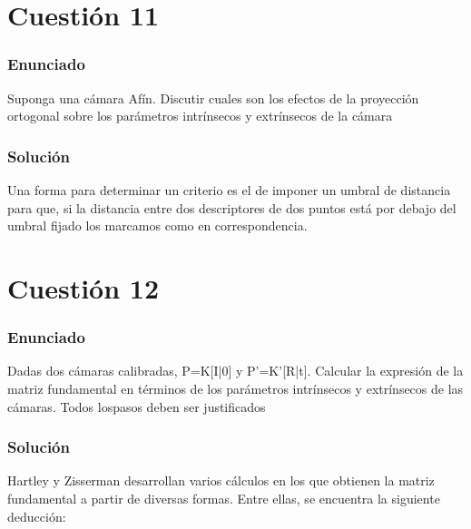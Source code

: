 
\section{Cuestión 11}

\subsubsection{Enunciado}

Suponga una cámara Afín. Discutir cuales son los efectos de la proyección ortogonal sobre los parámetros intrínsecos y extrínsecos de la cámara 

\subsubsection{Solución}

Una forma para determinar un criterio es el de imponer un umbral de distancia para que, si la distancia entre dos descriptores de dos puntos está por debajo del umbral fijado los marcamos como en correspondencia.


\section{Cuestión 12}

\subsubsection{Enunciado}

Dadas dos cámaras calibradas, P=K[I|0] y P'=K'[R|t]. Calcular la expresión de la matriz fundamental en términos de los parámetros intrínsecos y extrínsecos de las cámaras. Todos lospasos deben ser justificados

\subsubsection{Solución}


Hartley y Zisserman desarrollan varios cálculos en los que obtienen la matriz fundamental a partir de diversas formas. Entre ellas, se encuentra la siguiente deducción:

